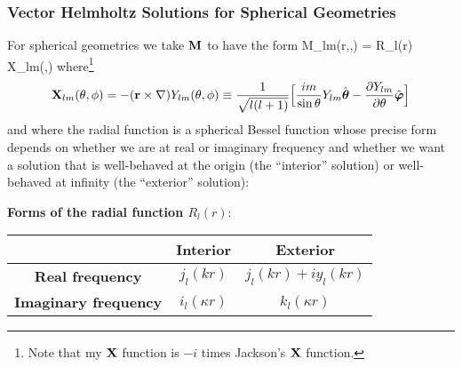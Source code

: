 \subsubsection*{Vector Helmholtz Solutions for Spherical Geometries}
For spherical geometries we take $\mathbf{M}$ to have the form
%
 {\vb M_{lm}(r,\theta,\phi) = R_l(r) \vb X_{lm}(\theta,\phi) }
%
where\footnote{Note that my $\mathbf{X}$ function is $-i$ times Jackson's $\mathbf{X}$
function.}
$$
 \mathbf{X}_{lm}(\theta, \phi)
=-(\mathbf{r} \times \nabla) Y_{lm}(\theta,\phi)
\equiv \frac{1}{\sqrt{l(l+1)}}
   \Big[ \frac{im}{\sin\theta} Y_{lm} \hat{\boldsymbol{\theta}}
         -\frac{\partial Y_{lm}}{\partial \theta} \hat{\boldsymbol{\varphi}}
   \Big]
$$
and where the radial function is a spherical Bessel function whose
precise form depends on whether we are at real or imaginary frequency and 
whether we want a solution that is well-behaved at the origin (the 
``interior'' solution) or well-behaved at infinity (the ``exterior'' 
solution):
\begin{center}
\textbf{Forms of the radial function $R_l(r):$}

\medskip

\begin{tabular}{|c|c|c|}  \hline
                               & \textbf{Interior} & \textbf{Exterior}   \\ \hline
\textbf{Real frequency}        & $j_l(kr)$         & $j_l(kr) +iy_l(kr)$ \\ \hline
\textbf{Imaginary frequency}   & $i_l(\kappa r)$   & $k_l(\kappa r)    $ \\ \hline
\end{tabular}
\end{center}
\medskip


